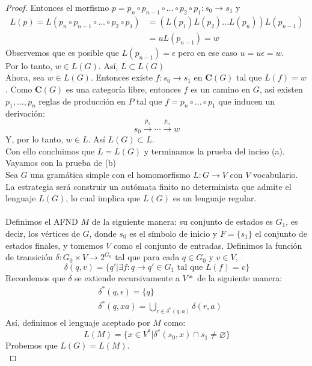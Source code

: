 \documentclass[../main.tex]{subfiles}
\begin{document}
\begin{proof}
 	Entonces el morfismo $p =  p_n \circ p_{n-1} \circ \dots \circ p_2 \circ p_1: s_0 \to s_1$ y
 	\begin{align*}
	 	 L(p)=L(p_n \circ p_{n-1} \circ \dots \circ p_2 \circ p_1) &=(L(p_1) L(p_2) \dots L(p_n)) L(p_{n-1}) \\
	 	 &= u L(p_{n-1}) = w
 	\end{align*}
 	Observemos que es posible que $L(p_{n-1}) = \epsilon$ pero en ese caso $u = u \epsilon = w$. \\
 	Por lo tanto, $w \in L(G)$. Así, $L \subset L(G)$\\
 	Ahora, sea $w \in L(G)$. 
 	Entonces existe $f:s_0 \to s_1$ en \textbf{C}$(G)$ tal que $L(f)=w$. Como \textbf{C}$(G)$ es una categoría libre, entonces $f$ es un camino en $G$, así existen $p_1, \dots, p_n$ reglas de producción en $P$ tal que $f=p_n \circ ... \circ p_1$ que inducen un derivación: 
 	\[
 		s_0 \xrightarrow{p_1} \cdots \xrightarrow{p_n} w
 	\]
 	Y, por lo tanto, $w \in L$. Así $L(G) \subset L$. \\
 	Con ello concluimos que $L=L(G)$ y terminamos la prueba del inciso (a). \\
 	Vayamos con la prueba de (b) \\
 	Sea $G$ una gramática simple con el homomorfismo $L: G \to V$ con $V$ vocabulario. \\
 	La estrategia será construir un autómata finito no determinista que admite el lenguaje $L(G)$, lo cual implica que $L(G)$ es un lenguaje regular. \\  \\
 	Definimos el AFND $M$ de la siguiente manera: su conjunto de estados es $G_1$, es decir, los vértices de $G$, donde $s_0$ es el símbolo de inicio y $F=\{s_1\}$ el conjunto de estados finales, y tomemos $V$ como el conjunto de entradas. Definimos la función de transición $\delta : G_0 \times V \to 2^{G_0}$ tal que para cada $q \in G_0$ y $v\in V$, 
 	\[
 		\delta (q,v) = \{q'|\exists f: q \to q' \in G_1 \text{ tal que }L(f)=v \}
 	\]
 	Recordemos que $\delta$ se extiende recursivamente a $V*$ de la siguiente manera:
 	\begin{align*}
 		&\delta ^* (q, \epsilon) = \{ q \} \\
 		&\delta ^* (q, xa) = \bigcup_{r \in \delta ^* (q,a)} \delta (r,a)
 	\end{align*}
	Así, definimos el lenguaje aceptado por $M$ como:
	\[
		L(M)=\{x \in V^* | \delta ^* (s_0, x) \cap {s_1} \neq \varnothing \}
	\]
 	Probemos que $L(G)=L(M)$. \\

\end{proof}
\end{document}
